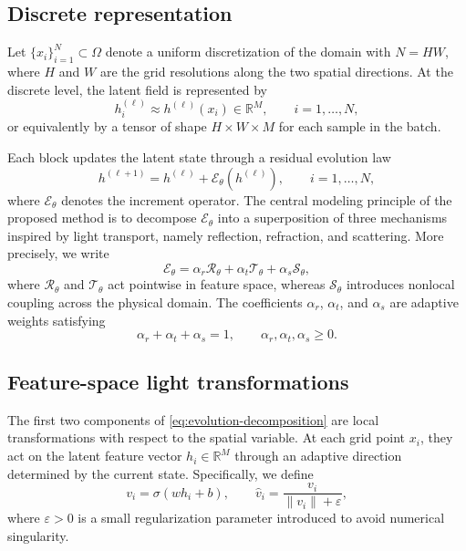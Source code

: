 \documentclass{article}
\begin{document}
\subsection{Discrete representation}

Let $\{x_i\}_{i=1}^N \subset \Omega$ denote a uniform discretization of the domain with $N = HW$, where $H$ and $W$ are the grid resolutions along the two spatial directions. At the discrete level, the latent field is represented by
\begin{equation}
h_i^{(\ell)} \approx h^{(\ell)}(x_i) \in \mathbb{R}^M,
\qquad i = 1,\dots,N,
\end{equation}
or equivalently by a tensor of shape $H \times W \times M$ for each sample in the batch.

Each block updates the latent state through a residual evolution law
\begin{equation}
h^{(\ell+1)}
=
h^{(\ell)}
+
\mathcal{E}_\theta(h^{(\ell)}),
\qquad i=1,\dots,N,
\label{eq:block-update}
\end{equation}
where $\mathcal{E}_\theta$ denotes the increment operator. The central modeling principle of the proposed method is to decompose $\mathcal{E}_\theta$ into a superposition of three mechanisms inspired by light transport, namely reflection, refraction, and scattering. More precisely, we write
\begin{equation}
\mathcal{E}_\theta
=
\alpha_r \mathcal{R}_\theta
+
\alpha_t \mathcal{T}_\theta
+
\alpha_s \mathcal{S}_\theta,
\label{eq:evolution-decomposition}
\end{equation}
where $\mathcal{R}_\theta$ and $\mathcal{T}_\theta$ act pointwise in feature space, whereas $\mathcal{S}_\theta$ introduces nonlocal coupling across the physical domain. The coefficients $\alpha_r$, $\alpha_t$, and $\alpha_s$ are adaptive weights satisfying
\begin{equation}
\alpha_r + \alpha_t + \alpha_s = 1,
\qquad
\alpha_r,\alpha_t,\alpha_s \ge 0.
\end{equation}

\subsection{Feature-space light transformations}

The first two components of \eqref{eq:evolution-decomposition} are local transformations with respect to the spatial variable. At each grid point $x_i$, they act on the latent feature vector $h_i \in \mathbb{R}^M$ through an adaptive direction determined by the current state. Specifically, we define
\begin{equation}
v_i = \sigma (w h_i + b),
\qquad
\widehat{v}_i = \frac{v_i}{\|v_i\| + \varepsilon},
\label{eq:adaptive-direction}
\end{equation}
where $\varepsilon > 0$ is a small regularization parameter introduced to avoid numerical singularity.
\end{document}
